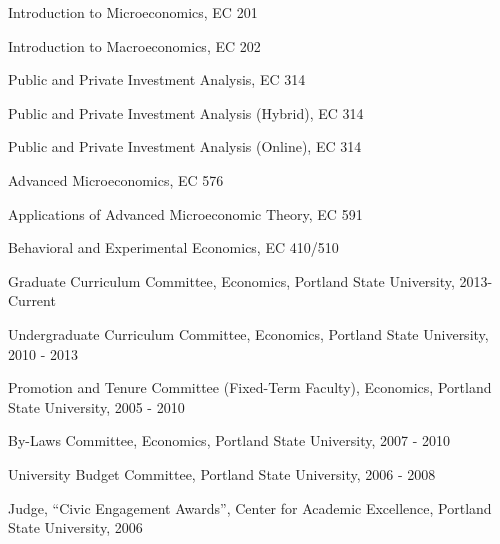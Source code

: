 \documentclass[Computer Science]{vita}
\begin{document}
\begin{vita}
\begin{Selected Instructional Activities}
    \begin{Courses}
    \item Introduction to Microeconomics, EC 201
    \item Introduction to Macroeconomics, EC 202
    \item Public and Private Investment Analysis, EC 314
    \item Public and Private Investment Analysis (Hybrid), EC 314
    \item Public and Private Investment Analysis (Online), EC 314
				
    \item Advanced Microeconomics, EC 576
    \item Applications of Advanced Microeconomic Theory, EC 591

    \item Behavioral and Experimental Economics, EC 410/510
    \end{Courses}

      
  \end{Selected Instructional Activities}
  \begin{Selected Professional and Service Activities}

    \begin{University}
    
    \item Graduate Curriculum Committee, Economics, Portland State University, 2013- Current

    \item Undergraduate Curriculum Committee, Economics, Portland
      State University, 2010 - 2013

    \item Promotion and Tenure Committee (Fixed-Term Faculty),
      Economics, Portland State University, 2005 - 2010
  
    \item By-Laws Committee, Economics, Portland State University,
      2007 - 2010

    \item University Budget Committee, Portland State University, 2006
      - 2008

    \item Judge, ``Civic Engagement Awards'', Center for Academic
      Excellence, Portland State University, 2006

    \end{University}

    \begin{Community}



\end{Community}
\end{Selected Professional and Service Activities}
\end{vita}
\end{document}
